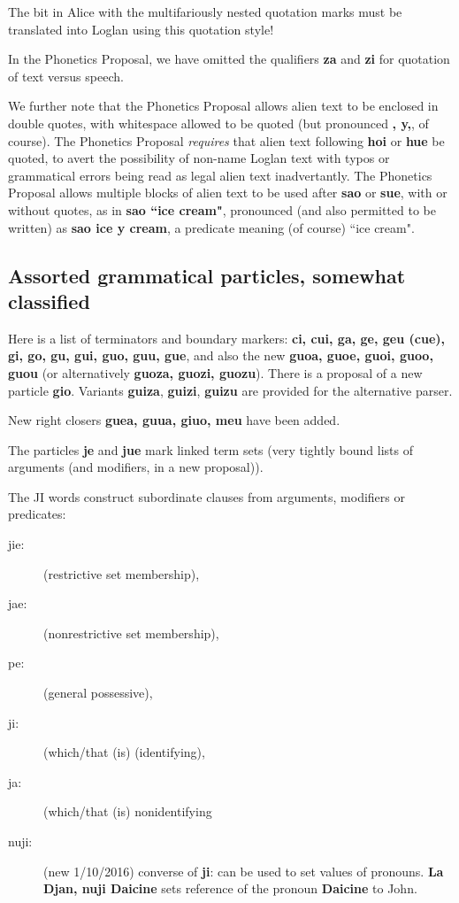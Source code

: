 \documentclass[12pt]{book}
\begin{document}
{The bit in Alice with the multifariously nested quotation marks must be translated into Loglan using this quotation style!

In the Phonetics Proposal, we have omitted the qualifiers {\bf za} and {\bf zi} for quotation of text versus speech.

We further note that the Phonetics Proposal allows alien text to be enclosed in double quotes, with whitespace allowed to be quoted
(but pronounced {\bf, y,}, of course).  The Phonetics Proposal {\em requires\/} that alien text following {\bf hoi} or {\bf hue} be quoted, to avert the possibility of non-name Loglan text with typos or grammatical errors being read as legal alien text inadvertantly.  The Phonetics Proposal allows multiple blocks of alien text to be used after {\bf sao} or {\bf sue}, with or without quotes, as in {\bf sao ``ice cream"}, pronounced (and also permitted to be written)
as {\bf sao ice y cream}, a predicate meaning (of course) ``ice cream".

\subsection{Assorted grammatical particles, somewhat classified}

Here is a list of terminators and boundary markers:  {\bf ci, cui, ga, ge, geu (cue), gi, go, gu, gui, guo, guu, gue}, and also the new {\bf guoa, guoe, guoi, guoo, guou} (or alternatively {\bf guoza, guozi, guozu}).  There is a  proposal of a new particle {\bf gio}.  Variants {\bf guiza}, {\bf guizi}, {\bf guizu} are provided for the alternative parser.

New right closers {\bf guea, guua, giuo, meu\/} have been added.

The particles {\bf je} and {\bf jue} mark linked term sets (very tightly bound lists of arguments (and modifiers, in a new proposal)).

The JI words  construct subordinate clauses from arguments,  modifiers or predicates:

\begin{description}
\item[jie:] (restrictive set membership), \item[jae:] (nonrestrictive set membership), \item[pe:] (general possessive), \item[ji:] (which/that (is) (identifying), \item[ja:] (which/that (is) nonidentifying\item[nuji:]  (new 1/10/2016)  converse of {\bf ji}:  can be used to set values of pronouns.  {\bf La Djan, nuji Daicine} sets reference of the pronoun {\bf Daicine} to
John.


\end{description}}
\end{document}
